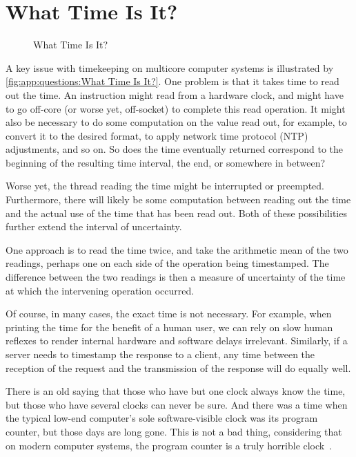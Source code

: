 
\section{What Time Is It?}
\label{sec:app:questions:What Time Is It?}

\begin{figure}
\centering
{}
\caption{What Time Is It?}
\end{figure}

A key issue with timekeeping on multicore computer systems is illustrated
by \cref{fig:app:questions:What Time Is It?}.
One problem is that it takes time to read out the time.
An instruction might read from a hardware clock, and might
have to go off-core (or worse yet, off-socket) to complete
this read operation.
It might also be necessary to do some computation on the value read out,
for example, to convert it to the desired format, to apply network time
protocol (NTP) adjustments, and so on.
So does the time eventually returned correspond to the beginning of
the resulting time interval, the end, or somewhere in between?

Worse yet, the thread reading the time might be interrupted or preempted.
Furthermore, there will likely be some computation between reading out
the time and the actual use of the time that has been read out.
Both of these possibilities further extend the interval of uncertainty.

One approach is to read the time twice, and take the arithmetic mean
of the two readings, perhaps one on each side of the operation being
timestamped.
The difference between the two readings is then a measure of uncertainty
of the time at which the intervening operation occurred.

Of course, in many cases, the exact time is not necessary.
For example, when printing the time for the benefit of a human user,
we can rely on slow human reflexes to render internal hardware and
software delays irrelevant.
Similarly, if a server needs to timestamp the response to a client, any
time between the reception of the request and the transmission of the
response will do equally well.

There is an old saying that those who have but one clock always
know the time, but those who have several clocks can never be sure.
And there was a time when the typical low-end computer's sole
software-visible clock was its program counter, but those days are
long gone.
This is not a bad thing, considering that on modern computer systems,
the program counter is a truly horrible
clock~\cite{PeterOkech2009InherentRandomness}.

